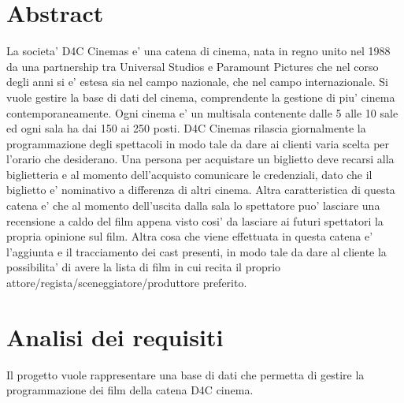 \documentclass[10pt]{article}
\begin{document}
\begin{titlepage}
		\vfill\vfill\vfill %
		
		
		
		
		
		\vfill %
		\tableofcontents
	\end{titlepage}
	\section{Abstract}	
	La societa' D4C Cinemas e' una catena di cinema, nata in regno unito nel 1988 da una partnership tra Universal Studios e Paramount Pictures che nel corso degli anni si e' estesa sia nel campo nazionale, che nel campo internazionale. Si vuole gestire la base di dati del cinema, comprendente la gestione di piu' cinema contemporaneamente. Ogni cinema e' un multisala contenente dalle 5 alle 10 sale ed ogni sala ha dai 150 ai 250 posti. D4C Cinemas rilascia giornalmente la programmazione degli spettacoli in modo tale da dare ai clienti varia scelta per l'orario che desiderano. Una persona per acquistare un biglietto deve recarsi alla biglietteria e al momento dell'acquisto comunicare le credenziali, dato che il biglietto e' nominativo a differenza di altri cinema. Altra caratteristica di questa catena e' che al momento dell'uscita dalla sala lo spettatore puo' lasciare una recensione a caldo del film appena visto cosi' da lasciare ai futuri spettatori la propria opinione sul film. Altra cosa che viene effettuata in questa catena e' l'aggiunta e il tracciamento dei cast presenti, in modo tale da dare al cliente la possibilita' di avere la lista di film in cui recita il proprio attore/regista/sceneggiatore/produttore preferito.
	\section{Analisi dei requisiti}
	
	Il progetto vuole rappresentare una base di dati che permetta di gestire la programmazione dei film della catena D4C cinema.
			
\end{document}
